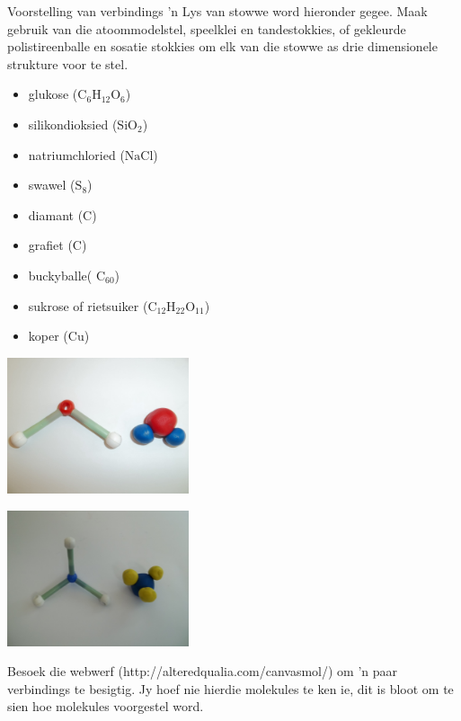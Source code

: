 \begin{activity}{Voorstelling van verbindings}
'n Lys van stowwe word hieronder gegee. Maak gebruik van die atoommodelstel, speelklei en tandestokkies, of gekleurde polistireenballe en sosatie stokkies om elk van die stowwe as drie dimensionele strukture voor te stel.\\
\begin{minipage}{.4\textwidth}
\begin{itemize}
 \item glukose ($\text{C}_{6}\text{H}_{12}\text{O}_{6}$)
\item silikondioksied ($\text{SiO}_{2}$)
\item natriumchloried ($\text{NaCl}$)
\item swawel ($\text{S}_{8}$)
\item diamant ($\text{C}$)
\item grafiet ($\text{C}$)
\item buckyballe( $\text{C}_{60}$)
\item sukrose of rietsuiker ($\text{C}_{12}\text{H}_{22}\text{O}_{11}$)
\item koper ($\text{Cu}$)
\end{itemize}
\end{minipage}
\begin{minipage}{.6\textwidth}
\begin{center}
\includegraphics[width=0.4\textwidth]{photos/water.jpg}
\end{center}  
\begin{center}
\includegraphics[width=0.4\textwidth]{photos/ammonia.jpg}
\end{center}
\end{minipage}
\end{activity}
\label{m38120*uid8310432}Besoek die webwerf (http://alteredqualia.com/canvasmol/) om 'n paar verbindings te besigtig. Jy
hoef nie hierdie molekules te ken ie, dit is bloot om te sien hoe molekules voorgestel word. 

